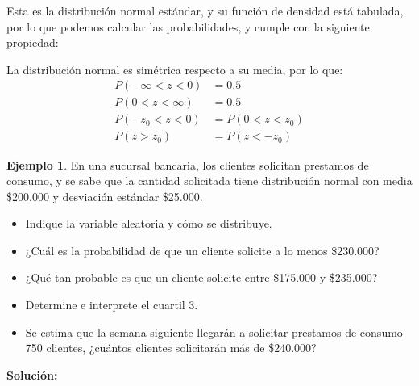 \documentclass{article}
\theoremstyle{definition}
\newtheorem{example}[definition]{Ejemplo}
\theoremstyle{plain}
\theoremstyle{remark}
\begin{document}
Esta es la distribución normal estándar, y su función de densidad está tabulada, por lo que podemos calcular las probabilidades, y cumple con la siguiente propiedad:

La distribución normal es simétrica respecto a su media, por lo que:
\begin{align*}
P(-\infty < z < 0) &= 0.5 \\
P(0 < z < \infty) &= 0.5 \\
P(-z_0 < z < 0) &= P(0 < z < z_0) \\
P(z > z_0) &= P(z < -z_0)
\end{align*}

\begin{example}
En una sucursal bancaria, los clientes solicitan prestamos de consumo, y se sabe que la cantidad solicitada tiene distribución normal con media \$200.000 y desviación estándar \$25.000.

\begin{itemize}
\item Indique la variable aleatoria y cómo se distribuye.
\item ¿Cuál es la probabilidad de que un cliente solicite a lo menos \$230.000?
\item ¿Qué tan probable es que un cliente solicite entre \$175.000 y \$235.000?
\item Determine e interprete el cuartil 3.
\item Se estima que la semana siguiente llegarán a solicitar prestamos de consumo 750 clientes, ¿cuántos clientes solicitarán más de \$240.000?
\end{itemize}

\end{example}

\textbf{Solución:}
\end{document}
